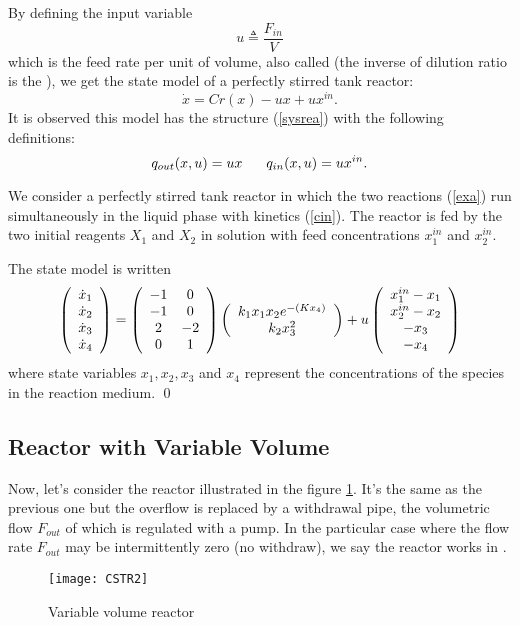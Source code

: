 By defining the input variable
$$ 
u \triangleq \frac{F_{in}}{V}
$$
which is the feed rate per unit of volume, also called {\em {}} (the inverse of dilution ratio is the ), we get the state model of a perfectly stirred tank reactor:
$$
\dot x = Cr(x) - ux + ux^{in}. \label{CSTR}
$$
It is observed this model has the structure (\ref{sysrea}) with the following definitions:
$$
q_{out}(x,u) = ux \hh \hh \hh q_{in}(x,u) = ux^{in}.
$$

\begin{exemple}{\blanc} \label{exempleCSTR}

We consider a perfectly stirred tank reactor in which the two reactions (\ref{exa}) run simultaneously
in the liquid phase with kinetics (\ref{cin}). 
The reactor is fed by the two initial reagents $X_1$ and $X_2$ in solution with feed concentrations $x_1^{in}$ and $x_2^{in}$.

The state model is written
$$
\bma{c} \dot x_1 \\ \dot x_2 \\ \dot x_3 \\ \dot x_4 \ema =
\bma{cc} -1 & 0 \\ -1 & 0 \\ 2 & -2 \\ 0 & 1 \ema \bma{c}
k_1x_1x_2e^{-(Kx_4)} \\ k_2x_3^2 \ema 
 + u \bma{c} x_1^{in} -x_1 \\ x_2^{in} -x_2 \\ -x_3 \\ -x_4
\ema   
$$
where state variables $x_1, x_2, x_3$ and $x_4$ represent the concentrations of the species in the reaction medium. \qed
\end{exemple}

\subsection{Reactor with Variable Volume }

Now, let's consider the reactor illustrated in the figure \ref{Fig:CSTR2}.
It's the same as the previous one but the overflow is replaced by a withdrawal pipe, the volumetric flow $F_{out}$ of which is regulated with a pump. In the particular case where the flow rate $F_{out}$ may be intermittently zero (no withdraw), we say the reactor works in .

\begin{figure}[htbp] 
   \centering
   \texttt{[image: CSTR2]} 
   \caption{Variable volume reactor}
   \label{Fig:CSTR2}
\end{figure}

